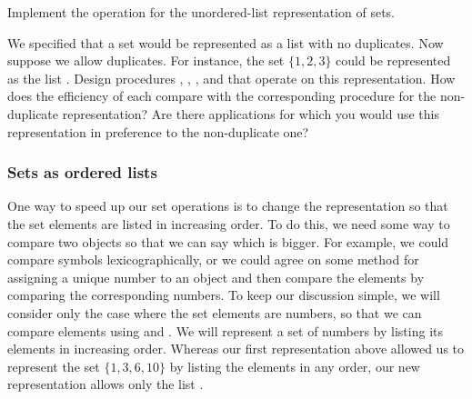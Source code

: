 \begin{exercise}
	\label{Exercise 2.59}
	Implement the  operation for the unordered-list representation of sets.
\end{exercise}



\begin{exercise}
	\label{Exercise 2.60}
	We specified that a set would be represented as a list with no duplicates.
	Now suppose we allow duplicates.
	For instance, the set \( \{1, 2, 3\} \) could be represented as the list .
	Design procedures , , , and  that operate on this representation.
	How does the efficiency of each compare with the corresponding procedure for the non-duplicate representation?
	Are there applications for which you would use this representation in preference to the non-duplicate one?
\end{exercise}



\subsubsection*{Sets as ordered lists}

One way to speed up our set operations is to change the representation so that the set elements are listed in increasing order.
To do this, we need some way to compare two objects so that we can say which is bigger.
For example, we could compare symbols lexicographically, or we could agree on some method for assigning a unique number to an object and then compare the elements by comparing the corresponding numbers.
To keep our discussion simple, we will consider only the case where the set elements are numbers, so that we can compare elements using \code{>} and \code{<}.
We will represent a set of numbers by listing its elements in increasing order.
Whereas our first representation above allowed us to represent the set \( \{1, 3, 6, 10\} \) by listing the elements in any order, our new representation allows only the list .

